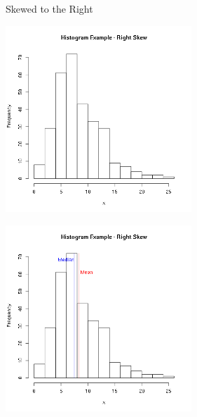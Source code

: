 \begin{frame}{Skewed to the Right}

  {
    \includegraphics[width=7cm]{img/rightSkew}
  }

  {
    \includegraphics[width=7cm]{img/rightSkewAnnotated}
  }

  
\end{frame}


